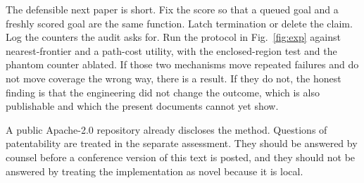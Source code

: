 \documentclass[11pt]{article}
\begin{document}
The defensible next paper is short. Fix the score so that a queued goal and a freshly scored goal are the same function. Latch termination or delete the claim. Log the counters the audit asks for. Run the protocol in Fig.~\ref{fig:exp} against nearest-frontier and a path-cost utility, with the enclosed-region test and the phantom counter ablated. If those two mechanisms move repeated failures and do not move coverage the wrong way, there is a result. If they do not, the honest finding is that the engineering did not change the outcome, which is also publishable and which the present documents cannot yet show.

A public Apache-2.0 repository already discloses the method. Questions of patentability are treated in the separate assessment. They should be answered by counsel before a conference version of this text is posted, and they should not be answered by treating the implementation as novel because it is local.
\end{document}
